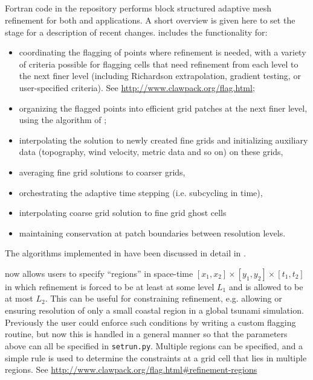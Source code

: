 %
%
%

\subsection{\amrclaw}\label{sec:amrclaw}
Fortran code in the \amrclaw repository performs block structured adaptive mesh
refinement \cite{BO,BC} for both
\clawpack and \geoclaw  applications.
A short overview is given
here to set the stage for a description of recent changes.
\amrclaw includes the functionality for:
\begin{itemize}
\item
coordinating the flagging of points where refinement is needed,
with a variety of criteria possible for flagging cells that need refinement
from each level to the next finer level (including Richardson extrapolation,
gradient testing, or user-specified criteria).  See
\url{http://www.clawpack.org/flag.html};
\item
organizing the flagged points into efficient grid
patches at the next finer level, using the algorithm of
\cite{mjb-rig:cluster};
\item interpolating the solution to newly created fine grids and initializing auxiliary data (topography, wind velocity, metric data and so on) on  these grids,
\item averaging fine grid solutions to coarser grids,
\item orchestrating the adaptive time stepping (i.e. subcycling in time),
\item interpolating coarse grid solution to fine grid ghost cells
\item maintaining conservation at patch boundaries between resolution levels.
\end{itemize}
The algorithms implemented in \amrclaw have been discussed in detail in
\cite{mjb-rjl:amrclaw,LeVequeGeorgeBerger:an11}.

\amrclaw now allows users to specify ``regions'' in space-time
$[x_1,x_2] \times [y_1,y_2] \times [t_1,t_2]$ in which refinement is forced to
be at least at some level $L_1$ and is allowed to be at most $L_2$.  This can be
useful for constraining refinement, e.g. allowing or ensuring resolution of only a small coastal region in a global tsunami simulation.
Previously the user could enforce such conditions by writing a custom
flagging routine, but now this is handled in a general manner so that the
parameters above  can all be specified in \texttt{setrun.py}.  Multiple
regions can be specified, and a simple rule is used to determine the
constraints at a grid cell that lies in multiple regions. See 
\url{http://www.clawpack.org/flag.html#refinement-regions}

